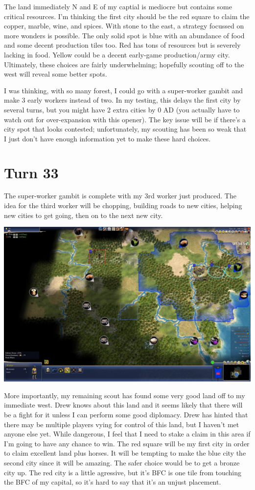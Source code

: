 \documentclass[10pt]{article}
\begin{document}
The land immediately N and E of my captial is mediocre but contains
some critical resources. I'm thinking the first city should be the red
square to claim the copper, marble, wine, and spices. With stone to
the east, a strategy focussed on more wonders is possible. The only
solid spot is blue with an abundance of food and some decent
production tiles too. Red has tons of resources but is severely
lacking in food. Yellow could be a decent early-game production/army
city. Ultimately, these choices are fairly underwhelming; hopefully
scouting off to the west will reveal some better spots.

I was thinking, with so many forest, I could go with a super-worker
gambit and make 3 early workers instead of two. In my testing, this
delays the first city by several turns, but you might have 2 extra
cities by 0 AD (you actually have to watch out for over-expansion with
this opener). The key issue will be if there's a city spot that looks
contested; unfortunately, my scouting has been so weak that I just
don't have enough information yet to make these hard choices.

\section*{Turn 33}

The super-worker gambit is complete with my 3rd worker just
produced. The idea for the third worker will be chopping, building
roads to new cities, helping new cities to get going, then on to the
next new city.

\includegraphics[width=1.0\textwidth]{turn33}

More importantly, my remaining scout has found some very good land off
to my immediate west. Drew knows about this land and it seems likely
that there will be a fight for it unless I can perform some good
diplomacy. Drew has hinted that there may be multiple players vying
for control of this land, but I haven't met anyone else yet. While
dangerous, I feel that I need to stake a claim in this area if I'm
going to have any chance to win. The red square will be my first city
in order to claim excellent land plus horses. It will be tempting to
make the blue city the second city since it will be amazing. The safer
choice would be to get a bronze city up. The red city is a little
agressive, but it's BFC is one tile from touching the BFC of my
capital, so it's hard to say that it's an unjust placement.
\end{document}
